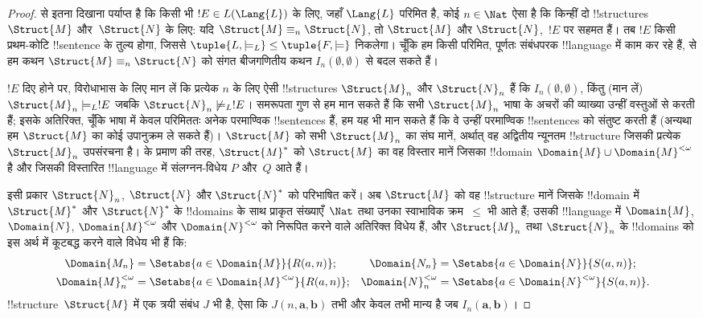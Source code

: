 \documentclass[../../../include/open-logic-section]{subfiles}
\begin{document}
\begin{proof}
 से इतना दिखाना पर्याप्त है कि किसी भी $!E
\in L(\Lang{L})$ के लिए, जहाँ $\Lang{L}$ परिमित है, कोई $n \in \Nat$ ऐसा है
कि किन्हीं दो !!{structure}s $\Struct{M}$ और~$\Struct{N}$ के लिए: यदि
$\Struct{M} \equiv_n \Struct{N}$, तो $\Struct{M}$ और $\Struct{N}$,~$!E$
पर सहमत हैं। तब $!E$ किसी प्रथम-कोटि !!{sentence} के तुल्य होगा, जिससे
$\tuple{L, \models_L} \le \tuple{F, \models}$ निकलेगा। चूँकि हम किसी
परिमित, पूर्णतः संबंधपरक !!{language} में काम कर रहे हैं,
 से हम कथन $\Struct{M} \equiv_n \Struct{N}$
को संगत बीजगणितीय कथन $I_n(\emptyset,\emptyset)$ से बदल सकते हैं।

$!E$ दिए होने पर, विरोधाभास के लिए मान लें कि प्रत्येक $n$ के लिए ऐसी
!!{structure}s $\Struct{M}_n$ और $\Struct{N}_n$ हैं कि
$I_n(\emptyset, \emptyset)$, किंतु (मान लें) $\Struct{M}_n \models_L !E$
जबकि $\Struct{N}_n \not\models_L !E$। समरूपता गुण से हम मान सकते हैं कि
सभी $\Struct{M}_n$ भाषा के अचरों की व्याख्या उन्हीं वस्तुओं से करती हैं;
इसके अतिरिक्त, चूँकि भाषा में केवल परिमिततः अनेक परमाण्विक !!{sentence}s
हैं, हम यह भी मान सकते हैं कि वे उन्हीं परमाण्विक !!{sentence}s को संतुष्ट
करती हैं (अन्यथा हम $\Struct{M}$ का कोई उपानुक्रम ले सकते हैं)।
$\Struct{M}$ को सभी $\Struct{M}_n$ का संघ मानें, अर्थात् वह अद्वितीय
न्यूनतम !!{structure} जिसकी प्रत्येक $\Struct{M}_n$ उपसंरचना है।
 के प्रमाण की तरह, $\Struct{M}^*$ को
$\Struct{M}$ का वह विस्तार मानें जिसका !!{domain} $\Domain{M} \cup
\Domain{M}^{<\omega}$ है और जिसकी विस्तारित !!{language} में संलग्नन-विधेय
$P$ और~$Q$ आते हैं।

इसी प्रकार $\Struct{N}_n$, $\Struct{N}$ और $\Struct{N}^*$ को परिभाषित
करें। अब $\Struct{M}$ को वह !!{structure} मानें जिसके !!{domain} में
$\Struct{M}^*$ और $\Struct{N}^*$ के !!{domain}s के साथ प्राकृत
संख्याएँ~$\Nat$ तथा उनका स्वाभाविक क्रम~$\le$ भी आते हैं; उसकी
!!{language} में $\Domain{M}$, $\Domain{N}$,
$\Domain{M}^{<\omega}$ और $\Domain{N}^{<\omega}$ को निरूपित करने वाले
अतिरिक्त विधेय हैं, और $\Struct{M}_n$ तथा $\Struct{N}_n$ के !!{domain}s को
इस अर्थ में कूटबद्ध करने वाले विधेय भी हैं कि:
\begin{align*}
  \Domain{M_n} & = \Setabs{a \in \Domain{M}}{R(a, n)}; & 
  \Domain{N_n} & = \Setabs{a \in \Domain{N}}{S(a,n)}; \\
  \Domain{M}^{<\omega}_n & = \Setabs{a \in \Domain{M}^{<\omega}}{R(a,n)}; &
  \Domain{N}^{<\omega}_n & = \Setabs{a \in \Domain{N}^{<\omega}}{S(a,n)}. 
\end{align*}
!!{structure}~$\Struct{M}$ में एक त्रयी संबंध $J$ भी है, ऐसा कि
$J(n, \mathbf{a}, \mathbf{b})$ तभी और केवल तभी मान्य है जब
$I_n(\mathbf{a}, \mathbf{b})$।


\end{proof}
\end{document}
